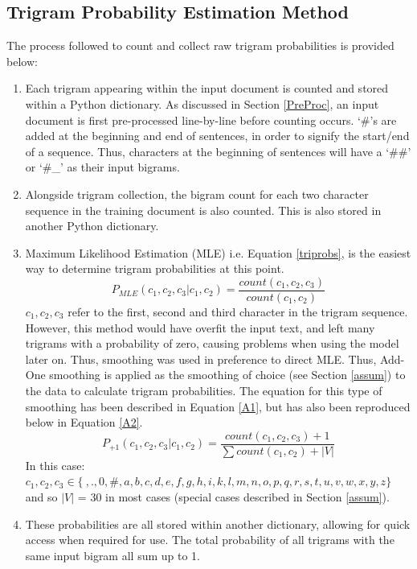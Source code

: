 \documentclass[12pt]{article}
\begin{document}
\subsection{Trigram Probability Estimation Method}
The process followed to count and collect raw trigram probabilities is provided below:
\begin{enumerate}
\item Each trigram appearing within the input document is counted and stored within a Python dictionary.  As discussed in Section \ref{PreProc}, an input document is first pre-processed line-by-line before counting occurs.  `\#'s are added at the beginning and end of sentences, in order to signify the start/end of a sequence.  Thus, characters at the beginning of sentences will have a `\#\#' or `\#\_' as their input bigrams.
\item Alongside trigram collection, the bigram count for each two character sequence in the training document is also counted. This is also stored in another Python dictionary.
\item Maximum Likelihood Estimation (MLE) i.e. Equation \ref{triprobs}, is the easiest way to determine trigram probabilities at this point.
\begin{equation}\label{triprobs}
P_{MLE}(c_{1},c_{2},c_{3}|c_{1},c_{2})= \dfrac{count(c_{1},c_{2},c_{3})}{count(c_1,c_2)} 
\end{equation}
$c_1,c_2,c_3$  refer to the first, second and third character in the trigram sequence.\\
\hfill\break
However, this method would have overfit the input text, and left many trigrams with a probability of zero, causing problems when using the model later on.  Thus, smoothing was used in preference to direct MLE.  Thus, Add-One smoothing is applied as the smoothing of choice (see Section \ref{assum}) to the data to calculate trigram probabilities.  The equation for this type of smoothing has been described in Equation \ref{A1}, but has also been reproduced below in Equation \ref{A2}.
\begin{equation}\label{A2}
 P_{+1}(c_{1},c_{2},c_{3} | c_{1},c_{2})= \dfrac{{count(c_{1},c_{2},c_{3})} + 1} {\sum count(c_1,c_2)+  |V|}
\end{equation}
In this case: $c_1,c_2,c_3 \in \{\ ,.,0,\#,a,b,c,d,e,f,g,h,i,k,l,m,n,o,p,q,r, s,t,u,v,w,x,y,z\}$ and so $|V|$ = 30 in most cases (special cases described in Section \ref{assum}).
\item  These probabilities are all stored within another dictionary, allowing for quick access when required for use.  The total probability of all trigrams with the same input bigram all sum up to 1.
\end{enumerate} 
\end{document}
